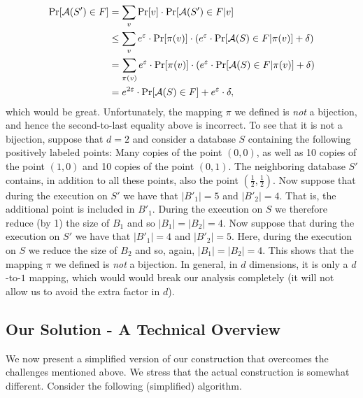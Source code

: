 \documentclass[12pt,a4paper,oneside,onecolumn]{book}
\begin{document}
\begin{align*}
    \Pr[\mathcal{A}(S')\in F] &= \sum_{v} \Pr[v]\cdot\Pr[\mathcal{A}(S')\in F | v]\\
    &\leq \sum_{v} e^{\varepsilon}\cdot\Pr[\pi(v)]\cdot\left(e^{\varepsilon}\cdot\Pr[\mathcal{A}(S)\in F | \pi(v)]+\delta\right)\\
    &= \sum_{\pi(v)} e^{\varepsilon}\cdot\Pr[\pi(v)]\cdot\left(e^{\varepsilon}\cdot\Pr[\mathcal{A}(S)\in F | \pi(v)]+\delta\right)\\
    &=e^{2\varepsilon}\cdot\Pr[\mathcal{A}(S)\in F]+e^{\varepsilon}\cdot\delta,
\end{align*}
which would be great. Unfortunately, the mapping $\pi$ we defined is {\em not} a bijection, and hence the second-to-last equality above is incorrect. To see that it is not a bijection, suppose that $d=2$ and consider a database $S$ containing the following positively labeled points: Many copies of the point $(0,0)$, as well as 10 copies of the point $(1,0)$ and 10 copies of the point $(0,1)$. The neighboring database $S'$ contains, in addition to all these points, also the point $\left(\frac{1}{2},\frac{1}{2} \right)$. Now suppose that during the execution on $S'$ we have that $|B'_1|=5$ and $|B'_2|=4$. That is, the additional point is included in $B'_1$. During the execution on $S$ we therefore reduce (by 1) the size of $B_1$ and so $|B_1|=|B_2|=4$. Now suppose that during the execution on $S'$ we have that $|B'_1|=4$ and $|B'_2|=5$. Here, during the execution on $S$ we reduce the size of $B_2$ and so, again,  $|B_1|=|B_2|=4$. This shows that the mapping $\pi$ we defined is {\em not} a bijection. In general, in $d$ dimensions, it is only a $d$-to-$1$ mapping, which would would break our analysis completely (it will not allow us to avoid the extra factor in $d$).

\subsection{Our Solution - A Technical Overview}

We now present a simplified version of our construction that overcomes the challenges mentioned above. We stress that the actual construction is somewhat different. Consider the following (simplified) algorithm.
\end{document}
